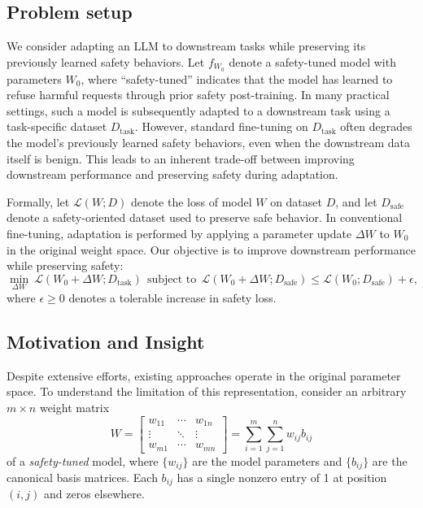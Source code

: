 \documentclass{article}
\begin{document}
\subsection{Problem setup}

\vspace{-1mm}

We consider adapting an LLM to downstream tasks while preserving its previously learned safety behaviors. Let $f_{W_0}$ denote a safety-tuned model with parameters $W_0$, where “safety-tuned” indicates that the model has learned to refuse harmful requests through prior safety post-training. In many practical settings, such a model is subsequently adapted to a downstream task using a task-specific dataset $D_{\mathrm{task}}$. However, standard fine-tuning on $D_{\mathrm{task}}$ often degrades the model’s previously learned safety behaviors, even when the downstream data itself is benign. This leads to an inherent trade-off between improving downstream performance and preserving safety during adaptation.


Formally, let $\mathcal{L}(W; D)$ denote the loss of model $W$ on dataset $D$, and let $D_{\mathrm{safe}}$ denote a safety-oriented dataset used to preserve safe behavior. In conventional fine-tuning, adaptation is performed by applying a parameter update $\Delta W$ to $W_0$ in the original weight space. Our objective is to improve downstream performance while preserving safety: 
\begin{equation} \min_{\Delta W}\ \mathcal{L}(W_0 + \Delta W; D_{\mathrm{task}}) \ \ \text{subject to} \ \  \mathcal{L}(W_0 + \Delta W; D_{\mathrm{safe}}) \leq \mathcal{L}(W_0; D_{\mathrm{safe}}) + \epsilon, 
\end{equation} 
where $\epsilon \geq 0$ denotes a tolerable increase in safety loss. 



\vspace{-1mm}

\subsection{Motivation and Insight}
\vspace{-1mm}

Despite extensive efforts, existing approaches \citep{safeInstr,sn-tune,safe-lora,safe-delta,Resta} operate in the original parameter space. To understand the limitation of this representation, consider 
an arbitrary  $m\times n$ weight matrix
\begin{equation}
W =
\begin{bmatrix}
w_{11} & \cdots & w_{1n} \\
\vdots & \ddots & \vdots \\
w_{m1} & \cdots & w_{mn}
\end{bmatrix}= %
\sum_{i=1}^m\sum_{j=1}^nw_{ij}b_{ij}
\end{equation}
of a \textit{safety-tuned} model, where $\{w_{ij}\}$ are the model parameters and $\{b_{ij}\}$ are the canonical basis matrices. Each $b_{ij}$ has a single nonzero entry of 1 at position $(i,j)$ and zeros elsewhere.
\end{document}
